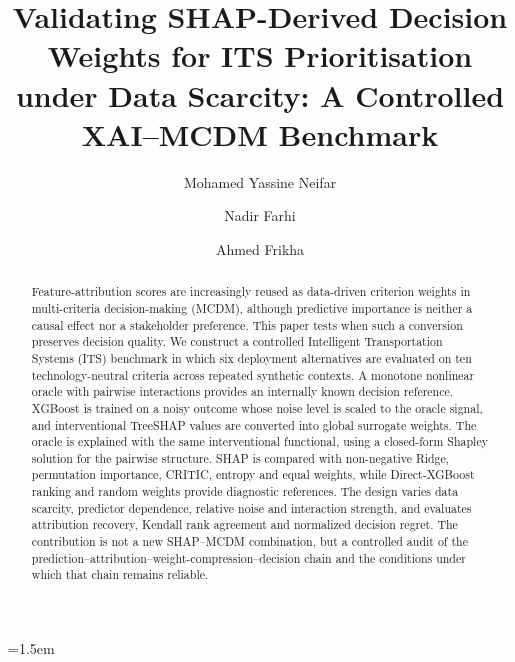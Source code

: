 \documentclass[runningheads]{llncs}
\newif\ifanonymous
\begin{document}
\emergencystretch=1.5em

\title{Validating SHAP-Derived Decision Weights for ITS Prioritisation under Data Scarcity: A Controlled XAI--MCDM Benchmark}

\ifanonymous
\author{Anonymous Author(s)}
\authorrunning{Anonymous Author(s)}
\institute{Anonymous institution(s)}
\else
\author{Mohamed Yassine Neifar \and
Nadir Farhi \and
Ahmed Frikha}
\fi

\maketitle

\begin{abstract}
Feature-attribution scores are increasingly reused as data-driven criterion weights in
multi-criteria decision-making (MCDM), although predictive importance is neither a causal
effect nor a stakeholder preference. This paper tests when such a conversion preserves
 decision quality. We construct a controlled Intelligent Transportation Systems (ITS)
benchmark in which six deployment alternatives are evaluated on ten technology-neutral
criteria across repeated synthetic contexts. A monotone nonlinear oracle with pairwise
interactions provides an internally known decision reference. XGBoost is trained on a noisy
outcome whose noise level is scaled to the oracle signal, and interventional TreeSHAP values
are converted into global surrogate weights. The oracle is explained with the same
interventional functional, using a closed-form Shapley solution for the pairwise structure.
SHAP is compared with non-negative Ridge, permutation importance, CRITIC, entropy and equal
weights, while Direct-XGBoost ranking and random weights provide diagnostic references.
The design varies data scarcity, predictor dependence, relative noise and interaction
strength, and evaluates attribution recovery, Kendall rank agreement and normalized decision
regret. The contribution is not a new SHAP--MCDM combination, but a controlled audit of the
prediction--attribution--weight-compression--decision chain and the conditions under which
that chain remains reliable.

\end{abstract}
\end{document}
